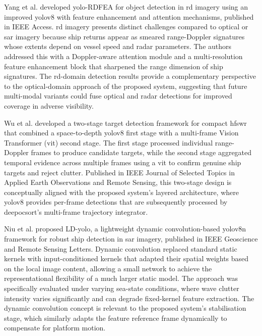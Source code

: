 Yang et al. \cite{Yang2024} developed \gls{yolo}-RDFEA for object detection in
\gls{rd} imagery using an improved \gls{yolov8} with feature enhancement
and attention mechanisms, published in IEEE Access. \gls{rd} imagery presents distinct
challenges compared to optical or \gls{sar} imagery because ship returns appear as
smeared range-Doppler signatures whose extents depend on vessel speed and radar
parameters. The authors addressed this with a Doppler-aware attention module and
a multi-resolution feature enhancement block that sharpened the range dimension
of ship signatures. The \gls{rd}-domain detection results provide a complementary
perspective to the optical-domain approach of the proposed system, suggesting
that future multi-modal variants could fuse optical and radar detections for
improved coverage in adverse visibility.
 
Wu et al. \cite{Wu2025} developed a two-stage target detection framework for
compact \gls{hfswr} that combined a space-to-depth
\gls{yolov8} first stage with a multi-frame Vision Transformer (\gls{vit}) second stage.
The first stage processed individual range-Doppler frames to produce candidate
targets, while the second stage aggregated temporal evidence across multiple frames
using a \gls{vit} to confirm genuine ship targets and reject clutter. Published in IEEE
Journal of Selected Topics in Applied Earth Observations and Remote Sensing,
this two-stage design is conceptually aligned with the proposed system's layered
architecture, where \gls{yolov8} provides per-frame detections that are subsequently
processed by \gls{deepocsort}'s multi-frame trajectory integrator.
 
Niu et al. \cite{Niu2026} proposed LD-\gls{yolo}, a lightweight dynamic
convolution-based \gls{yolov8}n framework for robust ship detection in \gls{sar} imagery,
published in IEEE Geoscience and Remote Sensing Letters. Dynamic convolution
replaced standard static kernels with input-conditioned kernels that adapted
their spatial weights based on the local image content, allowing a small network
to achieve the representational flexibility of a much larger static model.
The approach was specifically evaluated under varying sea-state conditions,
where wave clutter intensity varies significantly and can degrade fixed-kernel
feature extraction. The dynamic convolution concept is relevant to the proposed
system's stabilisation stage, which similarly adapts the feature reference frame
dynamically to compensate for platform motion.
 
